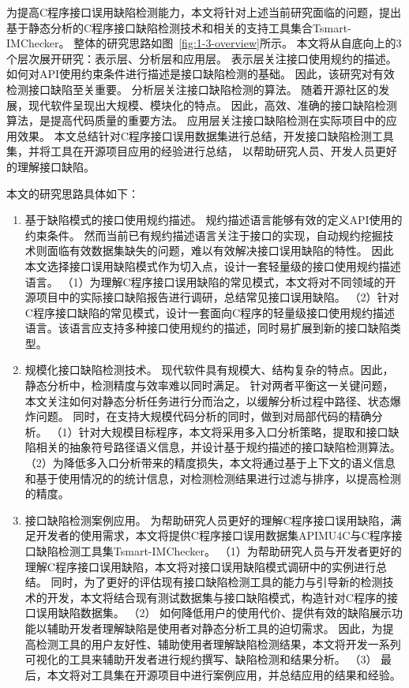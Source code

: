 为提高C程序接口误用缺陷检测能力，本文将针对上述当前研究面临的问题，提出基于静态分析的C程序接口缺陷检测技术和相关的支持工具集合Tsmart-IMChecker。
整体的研究思路如图~\ref{fig:1-3-overview}所示。
本文将从自底向上的3个层次展开研究：表示层、分析层和应用层。
表示层关注接口使用规约的描述。
如何对API使用约束条件进行描述是接口缺陷检测的基础。
因此，该研究对有效检测接口缺陷至关重要。
分析层关注接口缺陷检测的算法。
随着开源社区的发展，现代软件呈现出大规模、模块化的特点。
因此，高效、准确的接口缺陷检测算法，是提高代码质量的重要方法。
应用层关注接口缺陷检测在实际项目中的应用效果。
本文总结针对C程序接口误用数据集进行总结，开发接口缺陷检测工具集，并将工具在开源项目应用的经验进行总结，
以帮助研究人员、开发人员更好的理解接口缺陷。

本文的研究思路具体如下：
\begin{enumerate}
	\item {\kaishu 基于缺陷模式的接口使用规约描述。}
	规约描述语言能够有效的定义API使用的约束条件。
	然而当前已有规约描述语言关注于接口的实现，自动规约挖掘技术则面临有效数据集缺失的问题，难以有效解决接口误用缺陷的特性。
	因此本文选择接口误用缺陷模式作为切入点，设计一套轻量级的接口使用规约描述语言。
	（1）为理解C程序接口误用缺陷的常见模式，本文将对不同领域的开源项目中的实际接口缺陷报告进行调研，总结常见接口误用缺陷。
	（2）针对C程序接口缺陷的常见模式，设计一套面向C程序的轻量级接口使用规约描述语言。该语言应支持多种接口使用规约的描述，同时易扩展到新的接口缺陷类型。
	
	\item {\kaishu 规模化接口缺陷检测技术。}
	现代软件具有规模大、结构复杂的特点。因此，静态分析中，检测精度与效率难以同时满足。
	针对两者平衡这一关键问题，本文关注如何对静态分析任务进行分而治之，以缓解分析过程中路径、状态爆炸问题。
	同时，在支持大规模代码分析的同时，做到对局部代码的精确分析。
	（1）针对大规模目标程序，本文将采用多入口分析策略，提取和接口缺陷相关的抽象符号路径语义信息，并设计基于规约描述的接口缺陷检测算法。
	（2）为降低多入口分析带来的精度损失，本文将通过基于上下文的语义信息和基于使用情况的的统计信息，对检测检测结果进行过滤与排序，以提高检测的精度。
	
	\item {\kaishu 接口缺陷检测案例应用。}
	为帮助研究人员更好的理解C程序接口误用缺陷，满足开发者的使用需求，本文将提供C程序接口误用数据集APIMU4C与C程序接口缺陷检测工具集Tsmart-IMChecker。
	（1）为帮助研究人员与开发者更好的理解C程序接口误用缺陷，本文将对接口误用缺陷模式调研中的实例进行总结。
	同时，为了更好的评估现有接口缺陷检测工具的能力与引导新的检测技术的开发，本文将结合现有测试数据集与接口缺陷模式，构造针对C程序的接口误用缺陷数据集。
	（2）
	如何降低用户的使用代价、提供有效的缺陷展示功能以辅助开发者理解缺陷是使用者对静态分析工具的迫切需求。
	因此，为提高检测工具的用户友好性、辅助使用者理解缺陷检测结果，本文将开发一系列可视化的工具来辅助开发者进行规约撰写、缺陷检测和结果分析。
	（3）
	最后，本文将对工具集在开源项目中进行案例应用，并总结应用的结果和经验。	
\end{enumerate}





